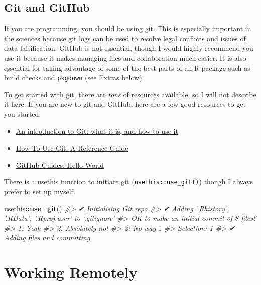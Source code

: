 \documentclass[]{book}
\newenvironment{Shaded}{\begin{snugshade}}{\end{snugshade}}
\newcommand{\CommentTok}[1]{\textcolor[rgb]{0.56,0.35,0.01}{\textit{#1}}}
\newcommand{\DecValTok}[1]{\textcolor[rgb]{0.00,0.00,0.81}{#1}}
\newcommand{\KeywordTok}[1]{\textcolor[rgb]{0.13,0.29,0.53}{\textbf{#1}}}
\newcommand{\NormalTok}[1]{#1}
\newcommand{\OperatorTok}[1]{\textcolor[rgb]{0.81,0.36,0.00}{\textbf{#1}}}
\providecommand{\tightlist}{%
  \setlength{\itemsep}{0pt}\setlength{\parskip}{0pt}}
\begin{document}
\hypertarget{git-and-github}{%
\subsection{Git and GitHub}\label{git-and-github}}

If you are programming, you should be using git. This is especially important in the sciences because git logs can be used to resolve legal conflicts and issues of data falsification. GitHub is not essential, though I would highly recommend you use it because it makes managing files and collaboration much easier. It is also essential for taking advantage of some of the best parts of an R package such as build checks and \texttt{pkgdown} (see Extras below)

To get started with git, there are \emph{tons} of resources available, so I will not describe it here. If you are new to git and GitHub, here are a few good resources to get you started:

\begin{itemize}
\tightlist
\item
  \href{https://medium.freecodecamp.org/what-is-git-and-how-to-use-it-c341b049ae61}{An introduction to Git: what it is, and how to use it}
\item
  \href{https://www.digitalocean.com/community/tutorials/how-to-use-git-a-reference-guide}{How To Use Git: A Reference Guide}
\item
  \href{https://guides.github.com/activities/hello-world/}{GitHub Guides: Hello World}
\end{itemize}

There is a usethis function to initiate git (\texttt{usethis::use\_git()}) though I always prefer to set up myself.

\begin{Shaded}
\begin{Highlighting}[]
\NormalTok{usethis}\OperatorTok{::}\KeywordTok{use_git}\NormalTok{()}
\CommentTok{#> ✔ Initialising Git repo}
\CommentTok{#> ✔ Adding '.Rhistory', '.RData', '.Rproj.user' to '.gitignore'}
\CommentTok{#> OK to make an initial commit of 8 files?}
\CommentTok{#> 1: Yeah}
\CommentTok{#> 2: Absolutely not}
\CommentTok{#> 3: No way}
\DecValTok{1}
\CommentTok{#> Selection: 1}
\CommentTok{#> ✔ Adding files and committing}
\end{Highlighting}
\end{Shaded}

\hypertarget{working-remotely}{%
\section{Working Remotely}\label{working-remotely}}
\end{document}
